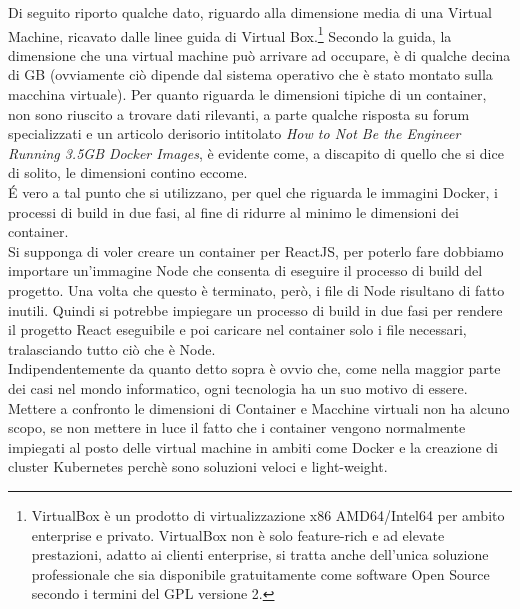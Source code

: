 Di seguito riporto qualche dato, riguardo alla dimensione media di una Virtual Machine, ricavato dalle linee guida di Virtual Box.\footnote{
VirtualBox è un prodotto di virtualizzazione x86 AMD64/Intel64 per ambito enterprise e privato. VirtualBox non è solo feature-rich e ad elevate prestazioni, adatto ai clienti enterprise, si tratta anche dell'unica soluzione professionale che sia disponibile gratuitamente come software Open Source secondo i termini del GPL versione 2.\cite{VirtualBox}
} Secondo la guida, la dimensione che una virtual machine può arrivare ad occupare, è di qualche decina di GB\cite{VirtualBoxGuideLines} (ovviamente ciò dipende dal sistema operativo che è stato montato sulla macchina virtuale). Per quanto riguarda le dimensioni tipiche di un container, non sono riuscito a trovare dati rilevanti, a parte qualche risposta su forum specializzati e un articolo derisorio intitolato \textit{How to Not Be the Engineer Running 3.5GB Docker Images}\cite{SarcasticArticle}, è evidente come, a discapito di quello che si dice di solito, le dimensioni contino eccome.
\\
\'E vero a tal punto che si utilizzano, per quel che riguarda le immagini Docker, i processi di build in due fasi, al fine di ridurre al minimo le dimensioni dei container.
\\
Si supponga di voler creare un container per ReactJS, per poterlo fare dobbiamo importare un'immagine Node che consenta di eseguire il processo di build del progetto. Una volta che questo è terminato, però, i file di Node risultano di fatto inutili. Quindi si potrebbe impiegare un processo di build in due fasi per rendere il progetto React eseguibile e poi caricare nel container solo i file necessari, tralasciando tutto ciò che è Node.
\\
Indipendentemente da quanto detto sopra è ovvio che, come nella maggior parte dei casi nel mondo informatico, ogni tecnologia ha un suo motivo di essere. Mettere a confronto le dimensioni di Container e Macchine virtuali non ha alcuno scopo, se non mettere in luce il fatto che i container vengono normalmente impiegati al posto delle virtual machine in ambiti come Docker e la creazione di cluster Kubernetes perchè sono soluzioni veloci e light-weight.



